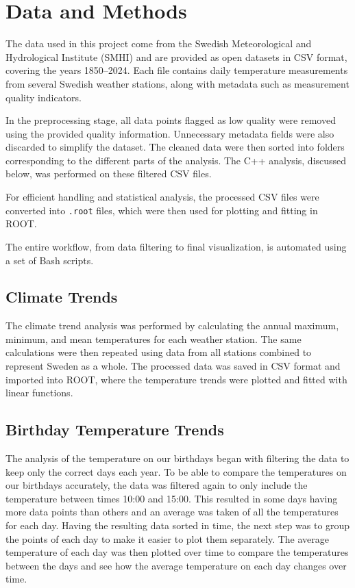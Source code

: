 \section{Data and Methods}

The data used in this project come from the Swedish Meteorological and Hydrological Institute (SMHI) and are provided as open datasets in CSV format, covering the years 1850–2024. Each file contains daily temperature measurements from several Swedish weather stations, along with metadata such as measurement quality indicators.

In the preprocessing stage, all data points flagged as low quality were removed using the provided quality information. Unnecessary metadata fields were also discarded to simplify the dataset. The cleaned data were then sorted into folders corresponding to the different parts of the analysis. The C++ analysis, discussed below, was performed on these filtered CSV files.

For efficient handling and statistical analysis, the processed CSV files were converted into \texttt{.root} files, which were then used for plotting and fitting in ROOT.

The entire workflow, from data filtering to final visualization, is automated using a set of Bash scripts.

\subsection{Climate Trends}
The climate trend analysis was performed by calculating the annual maximum, minimum, and mean temperatures for each weather station. The same calculations were then repeated using data from all stations combined to represent Sweden as a whole. The processed data was saved in CSV format and imported into ROOT, where the temperature trends were plotted and fitted with linear functions.

\subsection{Birthday Temperature Trends}
The analysis of the temperature on our birthdays began with filtering the data to keep only the correct days each year. To be able to compare the temperatures on our birthdays accurately, the data was filtered again to only include the temperature between times 10:00 and 15:00. This resulted in some days having more data points than others and an average was taken of all the temperatures for each day. Having the resulting data sorted in time, the next step was to group the points of each day to make it easier to plot them separately. The average temperature of each day was then plotted over time to compare the temperatures between the days and see how the average temperature on each day changes over time. 

